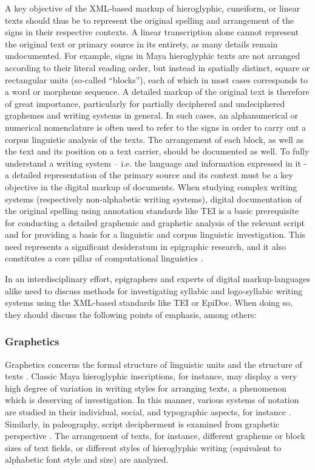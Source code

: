 \documentclass[amsthm,ebook]{saparticle}
\begin{document}
A key objective of the XML-based markup of hieroglyphic, cuneiform, or linear texts should thus be to represent the
original spelling and arrangement of the signs in their respective contexts. A linear transcription alone cannot
represent the original text or primary source in its entirety, as many details remain undocumented. For example, signs
in Maya hieroglyphic texts are not arranged according to their literal reading order, but instead in spatially
distinct, square or rectangular units (so-called ``blocks''), each of which in most cases corresponds to a word or
morpheme sequence. A detailed markup of the original text is therefore of great importance, particularly for partially
deciphered and undeciphered graphemes and writing systems in general. In such cases, an alphanumerical or numerical
nomenclature is often used to refer to the signs in order to carry out a corpus linguistic analysis of the texts. The
arrangement of each block, as well as the text and its position on a text carrier, should be documented as well. To
fully understand a writing system – i.e. the language and information expressed in it - a detailed representation of
the primary source and its context must be a key objective in the digital markup of documents. When studying complex
writing systems (respectively non-alphabetic writing systems), digital documentation of the original spelling using
annotation standards like TEI is a basic prerequisite for conducting a detailed graphemic and graphetic analysis of the
relevant script and for providing a basis for a linguistic and corpus linguistic investigation. This need represents a
significant desideratum in epigraphic research, and it also constitutes a core pillar of computational linguistics
\citep{McEneryWilson2001}. 

In an interdisciplinary effort, epigraphers and experts of digital markup-languages alike need to discuss methods for
investigating syllabic and logo-syllabic writing systems using the XML-based standards like TEI or EpiDoc. When doing
so, they should discuss the following points of emphasis, among others: 




\subsubsection[Graphetics ]{Graphetics }
Graphetics concerns the formal structure of linguistic units and the structure of texts \citep{Crystal1997}. Classic Maya
hieroglyphic inscriptions, for instance, may display a very high degree of variation in writing styles for arranging
texts, a phenomenon which is deserving of investigation. In this manner, various systems of notation are studied in
their individual, social, and typographic aspects, for instance \citep{Bußmann2002}. Similarly, in paleography, script
decipherment is examined from graphetic perspective \citep{Bußmann2002}. The arrangement of texts, for instance, different
grapheme or block sizes of text fields, or different styles of hieroglyphic writing (equivalent to alphabetic font
style and size) are analyzed. 
\end{document}
